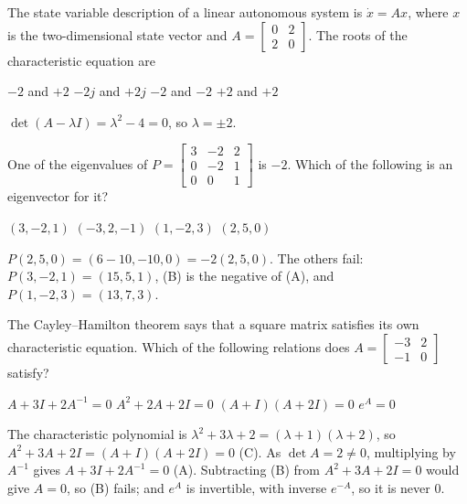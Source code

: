 \begin{question}[id=gate-ee2004-1, source=GATE EE 2004]
The state variable description of a linear autonomous system is $\dot{x} = Ax$, where $x$ is the two-dimensional state vector and $A = \begin{bmatrix} 0 & 2 \\ 2 & 0 \end{bmatrix}$. The roots of the characteristic equation are
\begin{options}
  \correct $-2$ and $+2$
  \option $-2j$ and $+2j$
  \option $-2$ and $-2$
  \option $+2$ and $+2$
\end{options}
\begin{solution}
$\det(A - \lambda I) = \lambda^2 - 4 = 0$, so $\lambda = \pm 2$.
\end{solution}
\end{question}

\begin{question}[id=gate-ee2005-3, source=GATE EE 2005, marks=2]
One of the eigenvalues of $P = \begin{bmatrix} 3 & -2 & 2 \\ 0 & -2 & 1 \\ 0 & 0 & 1 \end{bmatrix}$ is $-2$. Which of the following is an eigenvector for it?
\begin{options}
  \option $(3, -2, 1)$
  \option $(-3, 2, -1)$
  \option $(1, -2, 3)$
  \correct $(2, 5, 0)$
\end{options}
\begin{solution}
$P(2, 5, 0) = (6 - 10, -10, 0) = -2(2, 5, 0)$. The others fail: $P(3, -2, 1) = (15, 5, 1)$, (B) is the negative of (A), and $P(1, -2, 3) = (13, 7, 3)$.
\end{solution}
\end{question}

\begin{question}[id=gate-ee2007-2, type=msq, source=GATE EE 2007 (adapted), marks=2]
The Cayley--Hamilton theorem says that a square matrix satisfies its own characteristic equation. Which of the following relations does $A = \begin{bmatrix} -3 & 2 \\ -1 & 0 \end{bmatrix}$ satisfy?
\begin{options}
  \correct $A + 3I + 2A^{-1} = 0$
  \option $A^2 + 2A + 2I = 0$
  \correct $(A + I)(A + 2I) = 0$
  \option $e^A = 0$
\end{options}
\begin{solution}
The characteristic polynomial is $\lambda^2 + 3\lambda + 2 = (\lambda + 1)(\lambda + 2)$, so $A^2 + 3A + 2I = (A + I)(A + 2I) = 0$ (C). As $\det A = 2 \ne 0$, multiplying by $A^{-1}$ gives $A + 3I + 2A^{-1} = 0$ (A). Subtracting (B) from $A^2 + 3A + 2I = 0$ would give $A = 0$, so (B) fails; and $e^A$ is invertible, with inverse $e^{-A}$, so it is never 0.
\end{solution}
\end{question}

